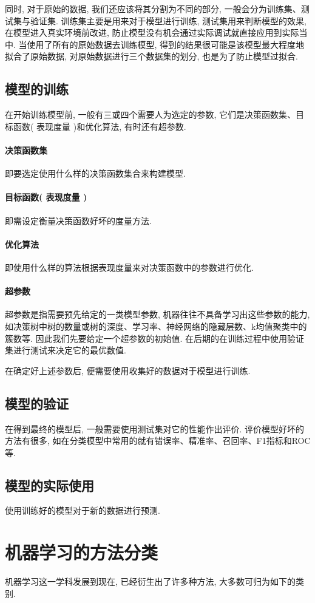 \documentclass[lang=cn,11pt,a4paper]{elegantpaper}
\begin{document}
同时, 对于原始的数据, 我们还应该将其分割为不同的部分, 一般会分为训练集、测试集与验证集. 训练集主要是用来对于模型进行训练, 测试集用来判断模型的效果, 在模型进入真实环境前改进, 防止模型没有机会通过实际调试就直接应用到实际当中. 当使用了所有的原始数据去训练模型, 得到的结果很可能是该模型最大程度地拟合了原始数据, 对原始数据进行三个数据集的划分, 也是为了防止模型过拟合. 
\subsection{模型的训练}
在开始训练模型前, 一般有三或四个需要人为选定的参数, 它们是决策函数集、目标函数( 表现度量 )和优化算法, 有时还有超参数. 
\paragraph{决策函数集}即要选定使用什么样的决策函数集合来构建模型.
\paragraph{目标函数( 表现度量 )}即需设定衡量决策函数好坏的度量方法.
\paragraph{优化算法}即使用什么样的算法根据表现度量来对决策函数中的参数进行优化. 
\paragraph{超参数}超参数是指需要预先给定的一类模型参数, 机器往往不具备学习出这些参数的能力, 如决策树中树的数量或树的深度、学习率、神经网络的隐藏层数、k均值聚类中的簇数等. 因此我们先要给定一个超参数的初始值. 在后期的在训练过程中使用验证集进行测试来决定它的最优数值.

在确定好上述参数后, 便需要使用收集好的数据对于模型进行训练. 
\subsection{模型的验证}
\par 在得到最终的模型后, 一般需要使用测试集对它的性能作出评价. 评价模型好坏的方法有很多, 如在分类模型中常用的就有错误率、精准率、召回率、F1指标和ROC等.
\subsection{模型的实际使用}
\par 使用训练好的模型对于新的数据进行预测.
\section{机器学习的方法分类}
\par 机器学习这一学科发展到现在, 已经衍生出了许多种方法, 大多数可归为如下的类别.
\end{document}
